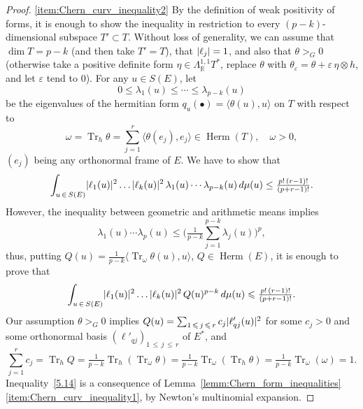 \documentclass[AHL,Unicode,longabstracts,published]{cedram}
\DeclareMathOperator{\Herm}{Herm}
\DeclareMathOperator{\Tr}{Tr}
\DeclarePairedDelimiter{\abs}{\lvert}{\rvert}
\newcommand*\bR{\mathbb{R}}
\let\leq\leqslant
\begin{document}
\begin{proof}
\eqref{item:Chern_curv_inequality2} By the definition of weak positivity of forms, it is enough to show the inequality in restriction to every $(p-k)$-dimensional subspace
$T'\subset T$. Without loss of generality, we can assume that $\dim T=p-k$ (and then take $T'=T$), that $\abs{\ell_j}=1$, and also that
$\theta>_G0$ (otherwise take a positive definite form
$\eta\in\Lambda_\bR^{1,1}T^*$, replace $\theta$ with $\theta_\varepsilon=\theta+\varepsilon\,\eta\otimes h$, and let $\varepsilon$ tend to $0$). For any $u\in S(E)$, let
\[
0\leq\lambda_1(u)\leq\cdots\leq\lambda_{p-k}(u)
\]
be the eigenvalues of the hermitian form
$q_u(\bullet)=\langle \theta(u),u\rangle$ on $T$ with respect to
\[
\omega=\Tr_h\theta=\sum_{j=1}^r\langle \theta(e_j),e_j\rangle\in
\Herm(T),\quad\omega>0,
\]
$(e_j)$ being any orthonormal frame of $E$. We have to show that
\[
\int_{u\,\in\,S(E)}
\abs{\ell_1(u)}^2\ldots\abs{\ell_k(u)}^2\,\lambda_1(u)\cdots\lambda_{p-k}(u)\,d\mu(u)\le
\tfrac{p!\,(r-1)!}{(p+r-1)!}.
\]
However, the inequality between geometric and arithmetic means implies
\[
\lambda_1(u)\cdots\lambda_p(u)\le
\bigg(\tfrac{1}{ p-k}\sum_{j=1}^{p-k}\lambda_j(u)\bigg)^p,
\]
thus, putting $Q(u)=\tfrac{1}{ p-k}\langle\Tr_\omega\theta(u),u\rangle$,
$Q\in\Herm(E)$, it is enough to prove that
\begin{equation}\label{5.14}
\int_{u\,\in\,S(E)}\abs{\ell_1(u)}^2\ldots\abs{\ell_k(u)}^2\,Q(u)^{p-k}\,d\mu(u)
\leq \tfrac{p!\,(r-1)!}{(p+r-1)!}.
\end{equation}
Our assumption $\theta>_G0$ implies
$Q(u)=\sum_{1\,\leq\,j\,\leq\,r} c_j\abs{\ell'_{qj}(u)}^2$ for some $c_j>0$ and some orthonormal basis $(\ell'_{qj})_{1\,\leq\,j\,\leq\,r}$ of
$E^*$, and
\[
\sum_{j=1}^r c_j=\Tr_hQ=\tfrac{1}{ p-k}\Tr_h(\Tr_\omega\theta) =\tfrac{1}{ p-k}\Tr_\omega(\Tr_h\theta)=\tfrac{1}{ p-k}\Tr_\omega(\omega)=1.
\]
Inequality~\eqref{5.14} is a consequence of Lemma~\ref{lemm:Chern_form_inequalities}\eqref{item:Chern_curv_inequality1}, by Newton's multinomial expansion.
\end{proof}
\end{document}
